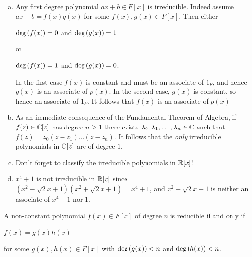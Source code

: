 \documentclass[11pt,fleqn,dvipsnames,usenames]{article}
\newcommand{\p}{\noindent}
\begin{document}
\begin{examples}~
\begin{enumerate}[(a)]
\item Any first degree polynomial $ax + b\in F[x]$ is irreducible.  Indeed assume $ax + b = f(x)g(x)$ for some $f(x),g(x)\in F[x]$.  Then either
\begin{center}
$\text{deg}\left(f(x)\right) = 0$ and $\text{deg}\left(g(x)\right) = 1$
\end{center}
or
\begin{center}
$\text{deg}\left(f(x)\right) = 1$ and $\text{deg}\left(g(x)\right) = 0$.
\end{center}
\p In the first case $f(x)$ is constant and must be an associate of $1_{F}$, and hence $g(x)$ is an associate of $p(x)$.  In the second case, $g(x)$ is constant, so hence an associate of $1_{F}$.  It follows that $f(x)$ is an associate of $p(x)$.

\item As an immediate consequence of the Fundamental Theorem of Algebra, if $f(z)\in\mathbb{C}[z]$ has degree $n\geq 1$ there exists $\lambda_{0},\lambda_{1},\ldots, \lambda_{n}\in \mathbb{C}$ such that $f(z) = z_{0}(z - z_{1})\dots(z - z_{n})$.  It follows that the \emph{only} irreducible polynomials in $\mathbb{C}[z]$ are of degree $1$.

\item {\color{blue}Don't forget to classify the irreducible polynomials in $\mathbb{R}[x]$!}     

\item $x^{4} + 1$ is not irreducible in $\mathbb{R}[x]$ since $(x^2 - \sqrt{2}x + 1)(x^2 + \sqrt{2}x + 1) = x^4 + 1$, and $x^2 - \sqrt{2}x + 1$ is neither an associate of $x^4+1$ nor $1$.
\end{enumerate}
\end{examples}
%
\begin{theorem}
A non-constant polynomial $f(x)\in F[x]$ of degree $n$ is reducible if and only if
\begin{center}
$f(x) = g(x)h(x)$
\end{center}
for some $g(x),h(x)\in F[x]$ with $\text{deg}\left(g(x)\right) < n$ and $\text{deg}\left(h(x)\right) < n$.
\end{theorem}
%
\end{document}

